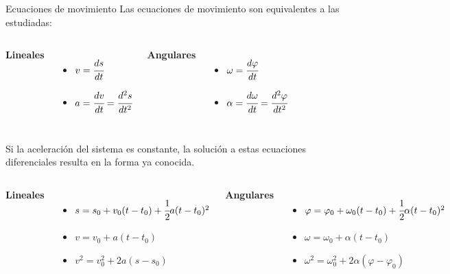 \begin{frame}{Ecuaciones de movimiento}
    Las ecuaciones de movimiento son equivalentes a las estudiadas:
    \vspace{1em}
    \begin{columns}
        \textbf{Lineales}
        \begin{itemize}
            \item $v=\cfrac{ds}{dt}$
            \item $a=\cfrac{dv}{dt}=\cfrac{d^2s}{dt^2}$
        \end{itemize}
        \textbf{Angulares}
         \begin{itemize}
            \item $\omega=\cfrac{d\varphi}{dt}$
            \item $\alpha=\cfrac{d\omega}{dt}=\cfrac{d^2\varphi}{dt^2}$
        \end{itemize}
    \end{columns}
    \vspace{1em}
    Si la aceleración del sistema es constante, la solución a estas ecuaciones diferenciales resulta en la forma ya conocida.

    \vspace{1em}
    \begin{columns}
    
        \textbf{Lineales}
        \small
        \begin{itemize}
            \item $s=s_0+v_0(t-t_0)+\cfrac{1}{2}a(t-t_0)^2$
            \item $v=v_0+a(t-t_0)$
            \item $v^2=v_0^2+2a(s-s_0)$
        \end{itemize}
        \textbf{Angulares}
        \small
         \begin{itemize}
            \item $\varphi=\varphi_0+\omega_0(t-t_0)+\cfrac{1}{2}\alpha(t-t_0)^2$
            \item $\omega=\omega_0+\alpha(t-t_0)$
            \item $\omega^2=\omega_0^2+2\alpha(\varphi-\varphi_0)$
        \end{itemize}
    \end{columns}
\end{frame}

